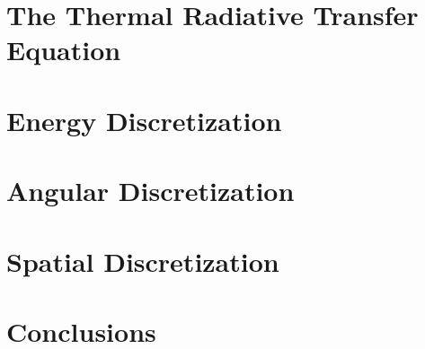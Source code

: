 \section{The Thermal Radiative Transfer Equation}
\label{sec::Sn_TRT}

\section{Energy Discretization}
\label{sec::Sn_MG}

\section{Angular Discretization}
\label{sec::Sn_Angle}

\section{Spatial Discretization}
\label{sec::Sn_Spatial}


\section{Conclusions}
\label{sec::Sn_Conclusions}